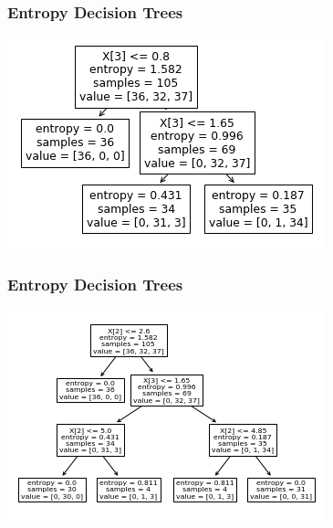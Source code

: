 \documentclass[xcolor=dvipsnames]{beamer}
\begin{document}
    \begin{frame}
    \frametitle{Entropy Decision Trees}
        \begin{center}
            \includegraphics[width=\textwidth]{depth2.png}
        \end{center}
    \end{frame}
    
    \begin{frame}
    \frametitle{Entropy Decision Trees}
        \begin{center}
            \includegraphics[width=\textwidth]{depth3.png}
        \end{center}
    \end{frame}
    
\end{document}
